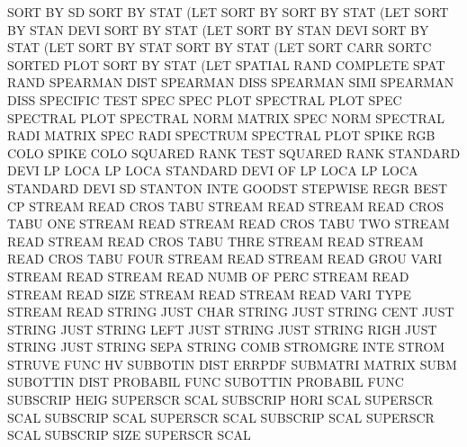 SORT     BY   SD                        SORT     BY   STAT (LET
SORT     BY                             SORT     BY   STAT (LET
SORT     BY   STAN DEVI                 SORT     BY   STAT (LET
SORT     BY   STAN DEVI                 SORT     BY   STAT (LET
SORT     BY   STAT                      SORT     BY   STAT (LET
SORT     CARR                           SORTC
SORTED   PLOT                           SORT     BY   STAT (LET
SPATIAL  RAND                           COMPLETE SPAT RAND
SPEARMAN DIST                           SPEARMAN DISS
SPEARMAN SIMI                           SPEARMAN DISS
SPECIFIC                                TEST     SPEC
SPEC     PLOT                           SPECTRAL PLOT
SPEC                                    SPECTRAL PLOT
SPECTRAL NORM                           MATRIX   SPEC NORM
SPECTRAL RADI                           MATRIX   SPEC RADI
SPECTRUM                                SPECTRAL PLOT
SPIKE    RGB  COLO                      SPIKE    COLO
SQUARED  RANK TEST                      SQUARED  RANK
STANDARD DEVI LP   LOCA                 LP       LOCA
STANDARD DEVI OF   LP   LOCA            LP       LOCA
STANDARD DEVI                           SD
STANTON  INTE                           GOODST
STEPWISE REGR                           BEST     CP
STREAM   READ CROS TABU                 STREAM   READ
STREAM   READ CROS TABU ONE             STREAM   READ
STREAM   READ CROS TABU TWO             STREAM   READ
STREAM   READ CROS TABU THRE            STREAM   READ
STREAM   READ CROS TABU FOUR            STREAM   READ
STREAM   READ GROU VARI                 STREAM   READ
STREAM   READ NUMB OF   PERC            STREAM   READ
STREAM   READ SIZE                      STREAM   READ
STREAM   READ VARI TYPE                 STREAM   READ
STRING   JUST CHAR                      STRING   JUST
STRING   CENT JUST                      STRING   JUST
STRING   LEFT JUST                      STRING   JUST
STRING   RIGH JUST                      STRING   JUST
STRING   SEPA                           STRING   COMB
STROMGRE INTE                           STROM
STRUVE   FUNC                           HV
SUBBOTIN DIST                           ERRPDF
SUBMATRI                                MATRIX   SUBM
SUBOTTIN DIST                           PROBABIL FUNC
SUBOTTIN                                PROBABIL FUNC
SUBSCRIP HEIG                           SUPERSCR SCAL
SUBSCRIP HORI SCAL                      SUPERSCR SCAL
SUBSCRIP SCAL                           SUPERSCR SCAL
SUBSCRIP SCAL                           SUPERSCR SCAL
SUBSCRIP SIZE                           SUPERSCR SCAL
